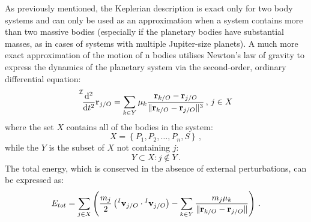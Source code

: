 As previously mentioned, the Keplerian description is exact only for two body systems and can only be used as an approximation when a system contains more than two massive bodies (especially if the planetary bodies have substantial masses, as in cases of systems with multiple Jupiter-size planets).  A much more exact approximation of the motion of n bodies utilises Newton's law of gravity to express the dynamics of the planetary system via the second-order, ordinary differential equation:
\begin{equation}\label{eq:nbody}
\fdddt{I}{\mf r_{j/O}} = \sum_{k\in Y}\mu_k \frac{\mf r_{k/O} - \mf r_{j/O}}{\Vert \mf r_{k/O} - \mf r_{j/O}\Vert^3}\,, \, j \in X
\end{equation}
where the set $X$ contains all of the bodies in the system:
\begin{equation} \label{eq:Xsetdef}
X = \left\{P_1, P_2,\ldots,P_n,S\right\} \,,
\end{equation}
while the $Y$ is the subset of $X$ not containing $j$:
\begin{equation}
Y \subset X : j \notin Y \,.
\end{equation}
The total energy, which is conserved in the absence of external perturbations, can be expressed as:
\begin{equation}\label{eq:Etot}
E_{tot} = \sum_{j \in X} \left(\frac{m_j}{2}\left({}^I \mathbf v_{j/O} \cdot {}^I \mathbf v_{j/O}\right) - \sum_{k \in Y} \frac{m_j\mu_k}{\Vert \mathbf r_{k/O} - \mathbf r_{j/O}\Vert}\right) \,. 
\end{equation} 

